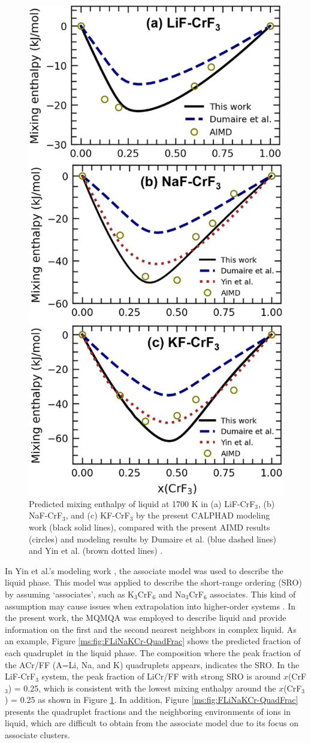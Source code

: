 \begin{figure}[H]
    \centering
    \includegraphics[width=0.5\linewidth]{moltensalts/Moltensalts-FLiNaKCr-Hmix.jpg}
    \caption{Predicted mixing enthalpy of liquid at 1700 K in (a) LiF-CrF$_3$, (b) NaF-CrF$_3$, and (c) KF-CrF$_3$ by the present CALPHAD modeling work (black solid lines), compared with the present AIMD results (circles) and modeling results by Dumaire et al. (blue dashed lines) \cite{dumaire2021thermodynamic} and Yin et al. (brown dotted lines) \cite{yin2018thermodynamic}.}
    \label{ms:fig:FLiNaKCr-Hmix}
\end{figure}

In Yin et al.’s modeling work \cite{yin2018thermodynamic}, the associate model was used to describe the liquid phase. This model was applied to describe the short-range ordering (SRO) by assuming ‘associates’, such as K$_3$CrF$_6$ and Na$_3$CrF$_6$ associates. This kind of assumption may cause issues when extrapolation into higher-order systems \cite{pelton2018phase}. In the present work, the MQMQA was employed to describe liquid and provide information on the first and the second nearest neighbors in complex liquid. As an example, Figure \ref{ms:fig:FLiNaKCr-QuadFrac} shows the predicted fraction of each quadruplet in the liquid phase. The composition where the peak fraction of the ACr/FF (A=Li, Na, and K) quadruplets appears, indicates the SRO. In the LiF-CrF$_3$ system, the peak fraction of LiCr/FF with strong SRO is around $x$(CrF$_3$) = 0.25, which is consistent with the lowest mixing enthalpy around the $x$(CrF$_3$) = 0.25 as shown in Figure \ref{ms:fig:FLiNaKCr-Hmix}. In addition, Figure \ref{ms:fig:FLiNaKCr-QuadFrac} presents the quadruplet fractions and the neighboring environments of ions in liquid, which are difficult to obtain from the associate model due to its focus on associate clusters.

